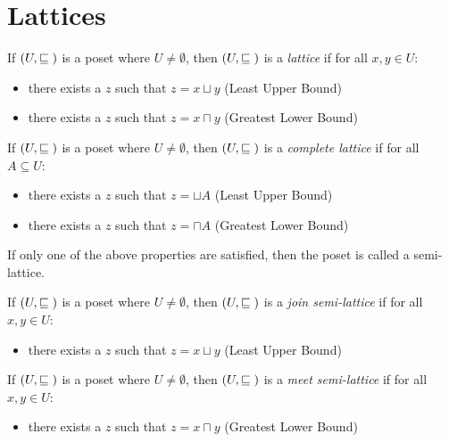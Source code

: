 \section{Lattices}
\begin{definition}
  If $(U, \sqsubseteq{})$ is a poset where $U \neq \emptyset$, then $(U, \sqsubseteq{})$ is
  a \emph{lattice} if for all $x,y\in U$:
  \begin{itemize}
  \item there exists a $z$ such that $z = x \sqcup y$ (Least Upper Bound)
  \item there exists a $z$ such that $z = x \sqcap y$ (Greatest Lower Bound)
  \end{itemize}
\end{definition}

\begin{definition}
  If $(U, \sqsubseteq{})$ is a poset where $U \neq \emptyset$, then $(U, \sqsubseteq{})$ is
  a \emph{complete lattice} if for all $A \subseteq U$:
  \begin{itemize}
  \item there exists a $z$ such that $z = \sqcup A$ (Least Upper Bound)
  \item there exists a $z$ such that $z = \sqcap A$ (Greatest Lower Bound)
  \end{itemize}
\end{definition}

If only one of the above properties are satisfied, then the poset is called a semi-lattice.

\begin{definition}
  If $(U, \sqsubseteq{})$ is a poset where $U \neq \emptyset$, then $(U, \sqsubseteq{})$ is
  a \emph{join semi-lattice} if for all $x,y\in U$:
  \begin{itemize}
  \item there exists a $z$ such that $z = x \sqcup y$ (Least Upper Bound)
  \end{itemize}
\end{definition}

\begin{definition}
  If $(U, \sqsubseteq{})$ is a poset where $U \neq \emptyset$, then $(U, \sqsubseteq{})$ is
  a \emph{meet semi-lattice} if for all $x,y\in U$:
  \begin{itemize}
  \item there exists a $z$ such that $z = x \sqcap y$ (Greatest Lower Bound)
  \end{itemize}
\end{definition}

